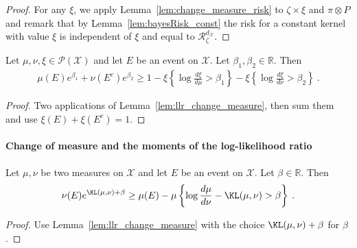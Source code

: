 \begin{proof}%
{}
For any $\xi$, we apply Lemma~\ref{lem:change_measure_risk} to $\zeta \times \xi$ and $\pi \otimes P$ and remark that by Lemma~\ref{lem:bayesRisk_const} the risk for a constant kernel with value $\xi$ is independent of $\xi$ and equal to $\mathcal R_\zeta^{d_{\mathcal X}}$.
\end{proof}


\begin{lemma}
  \label{lem:llr_change_measure_add}
  \leanok
  Let $\mu, \nu, \xi \in \mathcal P(\mathcal X)$ and let $E$ be an event on $\mathcal X$. Let $\beta_1, \beta_2 \in \mathbb{R}$. Then
  \begin{align*}
  \mu(E) e^{\beta_1} + \nu(E^c) e^{\beta_2} \ge 1 - \xi\left\{ \log\frac{d \xi}{d \mu} > \beta_1 \right\} - \xi\left\{ \log\frac{d \xi}{d \nu} > \beta_2 \right\} \: .
  \end{align*}
\end{lemma}

\begin{proof}\leanok
{}
Two applications of Lemma~\ref{lem:llr_change_measure}, then sum them and use $\xi(E)+\xi(E^c) = 1$.
\end{proof}



\paragraph{Change of measure and the moments of the log-likelihood ratio}

\begin{corollary}
  \label{cor:kl_change_measure}
  Let $\mu, \nu$ be two measures on $\mathcal X$ and let $E$ be an event on $\mathcal X$. Let $\beta \in \mathbb{R}$. Then
  \begin{align*}
  \nu(E) e^{\KL(\mu, \nu) + \beta} \ge \mu(E) - \mu\left\{ \log\frac{d \mu}{d \nu} - \KL(\mu, \nu) > \beta \right\} \: .
  \end{align*}
\end{corollary}

\begin{proof}
Use Lemma~\ref{lem:llr_change_measure} with the choice $\KL(\mu, \nu) + \beta$ for $\beta$.
\end{proof}


